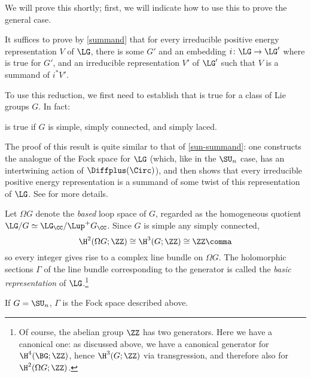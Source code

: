 We will prove this shortly; first, we will indicate how to use this to prove the
general case.

\begin{remark}\label{reduction}
	It suffices to prove by \cref{summand} that for every irreducible
	positive energy representation $V$ of $\LG$, there is some $G'$ and an
	embedding $i\colon \LG\to \LG'$ where  is true for $G'$, and
	an irreducible representation $V'$ of $\LG'$ such that $V$ is a summand of
	$i^\ast V'$.
\end{remark}

To use this reduction, we first need to establish that  is true for a
class of Lie groups $G$. In fact:

\begin{theorem}
	 is true if $G$ is simple, simply connected, and
	simply laced.
\end{theorem}

The proof of this result is quite similar to that of \cref{sun-summand}:
one constructs the analogue of the Fock space for $\LG$ (which, like in the
$\SU_n$ case, has an intertwining action of $\Diffplus(\Circ)$), and then shows
that every irreducible positive energy representation is a summand of some twist
of this representation of $\LG$. See \cite[\S 13.4]{loop} for more details.

\begin{construction}
	Let $\Omega G$ denote the \emph{based} loop space of $G$, regarded as the
	homogeneous quotient $\LG/G \simeq \LG_\CC/\Lup^+ G_\CC$.
	Since $ G $ is simple any simply connected,
	\begin{equation*}
		\H^2(\Omega G;\ZZ) \cong \H^3(G; \ZZ) \cong \ZZ \comma
	\end{equation*}
	so every integer gives rise to a complex line bundle on
	$\Omega G$. The holomorphic sections $\Gamma$ of the line bundle
	corresponding to the generator is called the \emph{basic representation} of
	$\LG$.\footnote{Of course, the abelian group $\ZZ$ has two generators. Here we have a canonical one: as
	discussed above, we have a canonical generator for $\H^4(\BG;\ZZ)$, hence $\H^3(G;\ZZ)$ via transgression, and
	therefore also for $\H^2(\Omega G;\ZZ)$.}
\end{construction}

\begin{example}
	If $G = \SU_n$, $\Gamma$ is the Fock space
	described above.
\end{example}

